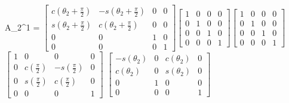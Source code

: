 \documentclass[12pt]{article}
\begin{document}
\begin{center}
    A_2^1 = $\left[\begin{matrix}c{\left(\theta_{2} + \frac{\pi}{2}\right)} & - s{\left(\theta_{2} + \frac{\pi}{2}\right)} & 0 & 0\\s{\left(\theta_{2} + \frac{\pi}{2}\right)} & c{\left(\theta_{2} + \frac{\pi}{2}\right)} & 0 & 0\\0 & 0 & 1 & 0\\0 & 0 & 0 & 1\end{matrix}\right]$$\left[\begin{matrix}1 & 0 & 0 & 0\\0 & 1 & 0 & 0\\0 & 0 & 1 & 0\\0 & 0 & 0 & 1\end{matrix}\right]$$\left[\begin{matrix}1 & 0 & 0 & 0\\0 & 1 & 0 & 0\\0 & 0 & 1 & 0\\0 & 0 & 0 & 1\end{matrix}\right]$$\left[\begin{matrix}1 & 0 & 0 & 0\\0 & c{\left(\frac{\pi}{2} \right)} & - s{\left(\frac{\pi}{2} \right)} & 0\\0 & s{\left(\frac{\pi}{2} \right)} & c{\left(\frac{\pi}{2} \right)} & 0\\0 & 0 & 0 & 1\end{matrix}\right]$\newline
    $\left[\begin{matrix}- s{\left(\theta_{2} \right)} & 0 & c{\left(\theta_{2} \right)} & 0\\c{\left(\theta_{2} \right)} & 0 & s{\left(\theta_{2} \right)} & 0\\0 & 1 & 0 & 0\\0 & 0 & 0 & 1\end{matrix}\right]$\newline\newline
    

\end{center}
\end{document}
